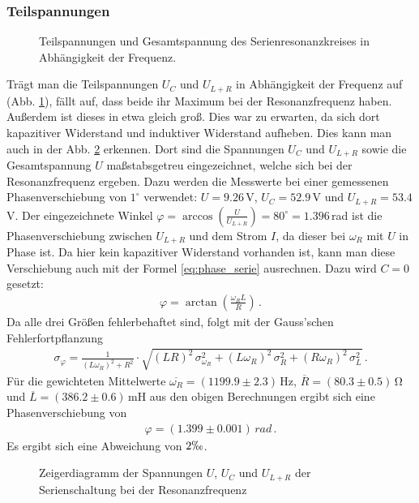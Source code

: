 \documentclass[12pt,a4paper,titlepage,headinclude,bibtotoc]{scrartcl}
\begin{document}
\subsubsection{Teilspannungen}
\begin{figure}[!htb]
	\centering
	
	\caption{Teilspannungen und Gesamtspannung des Serienresonanzkreises in Abhängigkeit der Frequenz.}
	\label{fig:teilU}
\end{figure}
Trägt man die Teilspannungen $U_C$ und $U_{L+R}$ in Abhängigkeit der Frequenz auf (Abb. \ref{fig:teilU}), fällt auf, dass beide ihr Maximum bei der Resonanzfrequenz haben.
Außerdem ist dieses in etwa gleich groß.
Dies war zu erwarten, da sich dort kapazitiver Widerstand und induktiver Widerstand aufheben.
Dies kann man auch in der Abb. \ref{fig:zeigerU} erkennen.
Dort sind die Spannungen $U_C$ und $U_{L+R}$ sowie die Gesamtspannung $U$ maßstabsgetreu eingezeichnet, welche sich bei der Resonanzfrequenz ergeben.
Dazu werden die Messwerte bei einer gemessenen Phasenverschiebung von $1^\circ$ verwendet: $U=9.26\,$V, $U_C=52.9\,$V und $U_{L+R}=53.4\,$V. 
Der eingezeichnete Winkel $\varphi=\arccos\left(\frac{U}{U_{L+R}}\right)=80^\circ=1.396\,$rad ist die Phasenverschiebung zwischen $U_{L+R}$ und dem Strom $I$, da dieser bei $\omega_R$ mit $U$ in Phase ist.
Da hier kein kapazitiver Widerstand vorhanden ist, kann man diese Verschiebung auch mit der Formel \eqref{eq:phase_serie} ausrechnen. Dazu wird $C=0$ gesetzt:
\begin{align}
	\varphi=\arctan\left(\frac{\omega_R L}{R}\right)\,.
\end{align}
Da alle drei Größen fehlerbehaftet sind, folgt mit der Gauss'schen Fehlerfortpflanzung
\begin{align}	
	\sigma_{\varphi}=\frac{1}{(L \omega_R)^{2} + R^{2}} \cdot \sqrt{(LR)^{2}\, \sigma_{\omega_R}^{2} + (L \omega_R)^{2}\,\sigma_{R}^{2}  + (R \omega_R)^{2}\,\sigma_{L}^{2}}\,.
\end{align}
Für die gewichteten Mittelwerte $\overline{\omega_R}=(1199.9\pm 2.3)\,\si\hertz$, $\overline{R}=(80.3 \pm 0.5)\,\si\ohm$ und $\overline{L}=(386.2 \pm 0.6)\,\si{\milli\henry}$ aus den obigen Berechnungen ergibt sich eine Phasenverschiebung von
\begin{align*}
	\varphi=(1.399 \pm 0.001)\,\si{rad}\,.
\end{align*}
Es ergibt sich eine Abweichung von $2\permil$.
\begin{figure}
	\centering	
	\caption{Zeigerdiagramm der Spannungen $U$, $U_C$ und $U_{L+R}$ der Serienschaltung bei der Resonanzfrequenz}
	\label{fig:zeigerU}
\end{figure}
\end{document}
